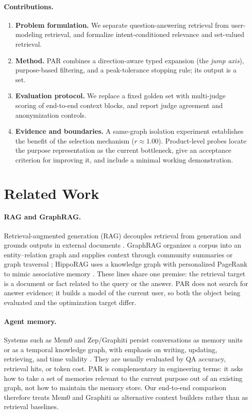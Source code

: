 \documentclass[11pt]{article}
\begin{document}
\paragraph{Contributions.}
\begin{enumerate}
  \item \textbf{Problem formulation.} We separate question-answering retrieval from
        user-modeling retrieval, and formalize intent-conditioned relevance and set-valued
        retrieval.
  \item \textbf{Method.} PAR combines a direction-aware typed expansion (the \emph{jump axis}),
        purpose-based filtering, and a peak-tolerance stopping rule; its output is a set.
  \item \textbf{Evaluation protocol.} We replace a fixed golden set with multi-judge scoring of
        end-to-end context blocks, and report judge agreement and anonymization controls.
  \item \textbf{Evidence and boundaries.} A same-graph isolation experiment establishes the
        benefit of the selection mechanism ($r\approx1.00$). Product-level probes locate the
        purpose representation as the current bottleneck, give an acceptance criterion for
        improving it, and include a minimal working demonstration.
\end{enumerate}

\section{Related Work}

\paragraph{RAG and GraphRAG.}
Retrieval-augmented generation (RAG) decouples retrieval from generation and grounds outputs
in external documents \citep{lewis2020rag}. GraphRAG organizes a corpus into an entity--relation
graph and supplies context through community summaries or graph traversal
\citep{edge2024graphrag}; HippoRAG uses a knowledge graph with personalized PageRank to mimic
associative memory \citep{gutierrez2024hipporag}. These lines share one premise: the retrieval
target is a document or fact related to the query or the answer. PAR does not search for
answer evidence; it builds a model of the current user, so both the object being evaluated and
the optimization target differ.

\paragraph{Agent memory.}
Systems such as Mem0 and Zep/Graphiti persist conversations as memory units or as a temporal
knowledge graph, with emphasis on writing, updating, retrieving, and time validity
\citep{chhikara2025mem0,rasmussen2025zep}. They are usually evaluated by QA accuracy, retrieval
hits, or token cost. PAR is complementary in engineering terms: it asks how to take a set of
memories relevant to the current purpose out of an existing graph, not how to maintain the
memory store. Our end-to-end comparison therefore treats Mem0 and Graphiti as alternative
context builders rather than as retrieval baselines.
\end{document}
